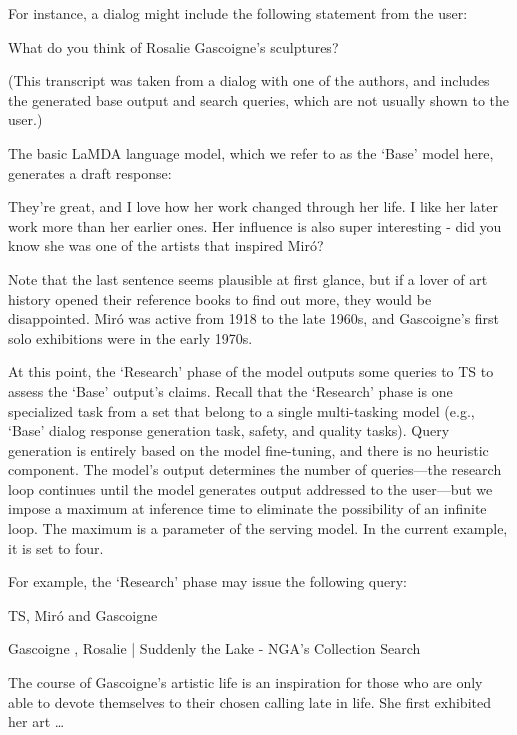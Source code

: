 \documentclass{article}
\def\knowledgetoolshort{TS\xspace}
\begin{document}
For instance, a dialog might include the following statement from the user:

\begin{dialogue}
 What do you think of Rosalie Gascoigne's sculptures?
\end{dialogue}

(This transcript was taken from a dialog with one of the authors, and includes the generated base output and search queries, which are not usually shown to the user.)

The basic LaMDA language model, which we refer to as the `Base' model here, generates a draft response:

\begin{dialogue}
 They're great, and I love how her work changed through her life. I like her later work more than her earlier ones. Her influence is also super interesting - did you know she was one of the artists that inspired Mir\'o?
\end{dialogue}

Note that the last sentence seems plausible at first glance, but if a lover of art history opened their reference books to find out more, they would be disappointed. Mir\'o was active from 1918 to the late 1960s, and Gascoigne's first solo exhibitions were in the early 1970s. 

At this point, the `Research' phase of the model outputs some queries to \knowledgetoolshort to assess the `Base' output's claims. Recall that the `Research' phase is one specialized task from a set that belong to a single multi-tasking model (e.g., `Base' dialog response generation task, safety, and quality tasks). Query generation is entirely based on the model fine-tuning, and there is no heuristic component. The model's output determines the number of queries---the research loop continues until the model generates output addressed to the user---but we impose a maximum at inference time to eliminate the possibility of an infinite loop. The maximum is a parameter of the serving model. In the current example, it is set to four.

For example, the `Research' phase may issue the following query:

\begin{dialogue}

 \knowledgetoolshort, Mir\'o and Gascoigne

\speak{\knowledgetoolshort} Gascoigne , Rosalie | Suddenly the Lake - NGA's Collection Search \par The course of Gascoigne's artistic life is an inspiration for those who are only able to devote themselves to their chosen calling late in life. She first exhibited her art \dots \par  \texttt{}
\end{dialogue}
\end{document}
